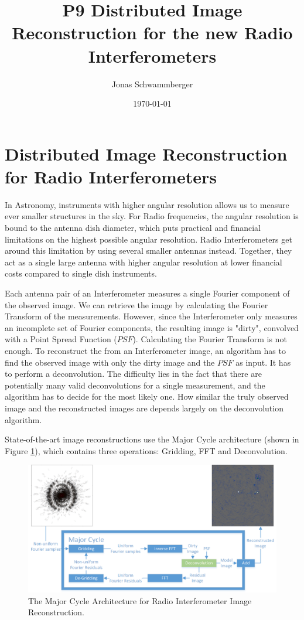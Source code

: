 \documentclass[11pt]{article}
\numberwithin{equation}{section}
\begin{document}
\title{P9 Distributed Image Reconstruction for the new Radio Interferometers}
\author{Jonas Schwammberger}
\date{\today}

\section*{Distributed Image Reconstruction for Radio Interferometers}
In Astronomy, instruments with higher angular resolution allows us to measure ever smaller structures in the sky. For Radio frequencies, the angular resolution is bound to the antenna dish diameter, which puts practical and financial limitations on the highest possible angular resolution. Radio Interferometers get around this limitation by using several smaller antennas instead. Together, they act as a single large antenna with higher angular resolution at lower financial costs compared to single dish instruments.

Each antenna pair of an Interferometer measures a single Fourier component of the observed image. We can retrieve the image by calculating the Fourier Transform of the measurements. However, since the Interferometer only measures an incomplete set of Fourier components, the resulting image is "dirty", convolved with a Point Spread Function ($PSF$). Calculating the Fourier Transform is not enough. To reconstruct the from an Interferometer image, an algorithm has to find the observed image with only the dirty image and the $PSF$ as input. It has to perform a deconvolution. The difficulty lies in the fact that there are potentially many valid deconvolutions for a single measurement, and the algorithm has to decide for the most likely one. How similar the truly observed image and the reconstructed images are depends largely on the deconvolution algorithm.

State-of-the-art image reconstructions use the Major Cycle architecture (shown in Figure \ref{hypo:major3}), which contains three operations: Gridding, FFT and Deconvolution.

\begin{figure}[h]
	\centering
	\includegraphics[width=0.80\linewidth]{./Major-Minor3.png}
	\caption{The Major Cycle Architecture for Radio Interferometer Image Reconstruction.}
	\label{hypo:major3}
\end{figure}
\end{document}
